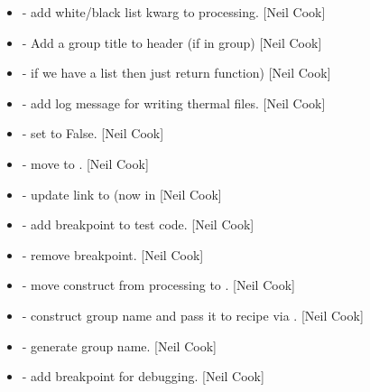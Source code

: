 \documentclass[a4paper,10pt,english]{report}
\begin{document}
\begin{itemize}
\item {} 
 - add white/black list
kwarg to processing. {[}Neil Cook{]}

\item {} 
 - Add a group title to header (if in group)
{[}Neil Cook{]}

\item {} 
 - if we have a list then just return
 function) {[}Neil Cook{]}

\item {} 
 - add log message for writing
thermal files. {[}Neil Cook{]}

\item {} 
 - set
 to False. {[}Neil Cook{]}

\item {} 
 - move  to .
{[}Neil Cook{]}

\item {} 
 - update link to  (now in
 {[}Neil Cook{]}

\item {} 
 - add breakpoint to test code. {[}Neil Cook{]}

\item {} 
 - remove breakpoint. {[}Neil Cook{]}

\item {} 
 - move  construct from processing
to . {[}Neil Cook{]}

\item {} 
 - construct group name and pass
it to recipe via . {[}Neil Cook{]}

\item {} 
 - generate group name. {[}Neil Cook{]}

\item {} 
 - add breakpoint for debugging.
{[}Neil Cook{]}


\end{itemize}
\end{document}

